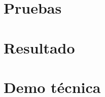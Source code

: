\section{Pruebas}
\label{cap5:sec:pruebas}



\section{Resultado}
\label{cap5:sec:resultado}


\section{Demo t\'ecnica}
\label{cap5:sec:demo}



